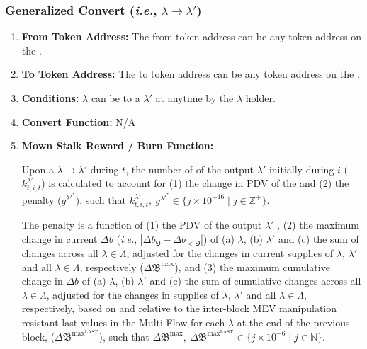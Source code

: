 \documentclass[class=article, crop=false]{standalone}
\begin{document}

\subsubsection{Generalized Convert (\textit{i.e.}, $\lambda \rightarrow \lambda'$)}

\begin{enumerate}
    \item \textbf{From Token Address:} The from token address can be any token address on the .
    
    \item \textbf{To Token Address:} The to token address can be any token address on the .
    
    \item \textbf{Conditions:}  $\lambda$ can be  to a $\lambda'$  at anytime by the $\lambda$  holder.
    
    \item \textbf{Convert Function:} N/A

    \item \textbf{Mown Stalk Reward / Burn Function:} 

    Upon a $\lambda \rightarrow \lambda'$  during $t$, the number of  of the output $\lambda'$  initially  during $i$ ($k_{t,i,t}^{\lambda'}$) is calculated to account for (1) the change in PDV of the  and (2) the  penalty ($g^{\lambda'^{*}}$), such that $k_{t,i,t}^{\lambda'},\ g^{\lambda'^{*}} \in \{j \times 10^{-16} \mid j \in \mathbb{Z}^{+} \}$.
    
    The  penalty is a function of (1) the PDV of the output $\lambda'$ , (2) the maximum change in current $\Delta b$ (\textit{i.e.}, $|\Delta b_{\Game} - \Delta b_{<\Game}|$) of (a) $\lambda$, (b) $\lambda'$ and (c) the sum of changes across all $\lambda \in \Lambda$, adjusted for the changes in current supplies of $\lambda$, $\lambda'$ and all $\lambda \in \Lambda$, respectively ($\Delta \mathfrak{B}^\text{max}$), and (3) the maximum cumulative change in $\Delta b$ of (a) $\lambda$, (b) $\lambda'$ and (c) the sum of cumulative changes across all $\lambda \in \Lambda$, adjusted for the changes in supplies of $\lambda$, $\lambda'$ and all $\lambda \in \Lambda$, respectively, based on and relative to the inter-block MEV manipulation resistant last values in the Multi-Flow  for each $\lambda$ at the end of the previous block, ($\Delta \mathfrak{B}^{\text{max}^{\text{LAST}}}$), such that $\Delta \mathfrak{B}^\text{max},\ \Delta \mathfrak{B}^{\text{max}^{\text{LAST}}} \in \{j \times 10^{-6} \mid j \in \mathbb{N} \}$.


\end{enumerate}
\end{document}
